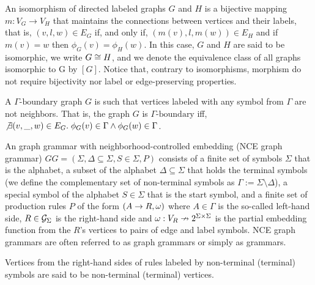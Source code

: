 \documentclass[]{report}
\begin{document}
\begin{definition}
	An isomorphism of directed labeled graphs $G$ and $H$ is a bijective mapping $m: V_G \to V_H$ that maintains the connections between vertices and their labels, that is, $(v,l,w) \in E_G$ if, and only if,  $(m(v),l,m(w)) \in E_H$ and if $m(v) = w$ then $\phi_G(v) = \phi_H(w)$. In this case, $G$ and $H$ are said to be isomorphic, we write $G \isomorph H$, and we denote the equivalence class of all graphs isomorphic to G by $[G]$.
	Notice that, contrary to isomorphisms, morphism do not require bijectivity nor label or edge-preserving properties.
\end{definition}

\begin{definition}
	A $\Gamma\text{-boundary}$ graph $G$ is such that vertices labeled with any symbol from $\Gamma$ are not neighbors. That is, the graph $G$ is $\Gamma\text{-boundary}$ iff, $\not\exists (v,\_,w) \in E_G \. \phi_G(v) \in \Gamma \land \phi_G(w) \in \Gamma$.
\end{definition}


\begin{definition}
	\label{def:gg}
	An graph grammar with neighborhood-controlled embedding (NCE graph grammar) $GG = (\Sigma, \Delta \subseteq \Sigma, S \in \Sigma, P)$ consists of a finite set of symbols $\Sigma$ that is the alphabet, a subset of the alphabet $\Delta \subseteq \Sigma$ that holds the terminal symbols (we define the complementary set of non-terminal symbols as $\Gamma := \Sigma \setminus \Delta$), a special symbol of the alphabet $S \in \Sigma$ that is the start symbol, and a finite set of production rules $P$ of the form $(A \pro R, \omega)$ where $A \in \Gamma$ is the so-called left-hand side, $R \in \allgraphs{\Sigma}$ is the right-hand side and $\omega : V_R \pto 2^{\Sigma \times \Sigma}$ is the partial embedding function from the $R$'s vertices to pairs of edge and label symbols. NCE graph grammars are often referred to as graph grammars or simply as grammars.
	
	Vertices from the right-hand sides of rules labeled by non-terminal (terminal) symbols are said to be non-terminal (terminal) vertices.
\end{definition}
\end{document}
